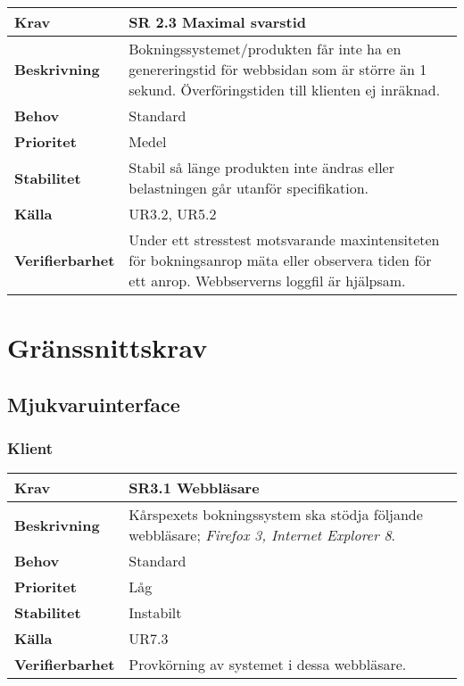 \documentclass[a4paper, twoside, 11pt, titlepage]{article}
\begin{document}
\begin{tabular} { p{2.6cm} p{12.5cm} }
	\hline
	\sffamily\textbf{Krav} & \sffamily\textbf{SR 2.3 Maximal svarstid } \\
	\hline
	\sffamily\textbf{Beskrivning} & Bokningssystemet/produkten får inte ha en genereringstid för webbsidan som är större än 1 sekund. Överföringstiden till klienten ej inräknad.  \\
	\hline
	\sffamily\textbf{Behov} & Standard  \\
	\hline
	\sffamily\textbf{Prioritet} & Medel  \\
	\hline
	\sffamily\textbf{Stabilitet} & Stabil så länge produkten inte ändras eller belastningen går utanför specifikation.  \\
	\hline
	\sffamily\textbf{Källa} &  UR3.2, UR5.2  \\
	\hline
	\sffamily\textbf{Verifierbarhet} & Under ett stresstest motsvarande maxintensiteten för bokningsanrop mäta eller observera tiden för ett anrop. Webbserverns loggfil är hjälpsam.  \\
	\hline
\end{tabular}


\clearpage
\section{Gränssnittskrav}



	\subsection{Mjukvaruinterface}



		\subsubsection{Klient}


		\begin{tabular} { p{2.6cm} p{12.5cm} }
			\hline
			\sffamily\textbf{Krav} & \sffamily\textbf{SR3.1 Webbläsare } \\
			\hline
			\sffamily\textbf{Beskrivning} & Kårspexets bokningssystem ska stödja följande webbläsare; \emph{Firefox 3\underline{}, \emph{Internet Explorer 8}}.   \\
			\hline
			\sffamily\textbf{Behov} & Standard  \\
			\hline
			\sffamily\textbf{Prioritet} & Låg  \\
			\hline
			\sffamily\textbf{Stabilitet} & Instabilt  \\
			\hline
			\sffamily\textbf{Källa} & UR7.3  \\
			\hline
			\sffamily\textbf{Verifierbarhet} & Provkörning av systemet i dessa webbläsare.  \\
			\hline
		\end{tabular}
		\vspace{6mm}
\end{document}
